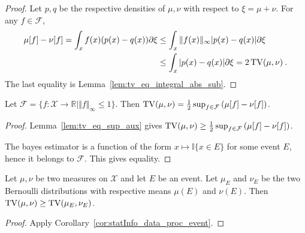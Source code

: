 \begin{proof}
Let $p,q$ be the respective densities of $\mu, \nu$ with respect to $\xi=\mu+\nu$.
For any $f \in \mathcal F$,
\begin{align*}
\mu[f] - \nu[f]
= \int_x f(x)(p(x) - q(x)) \partial\xi
&\le \int_x \Vert f(x) \Vert_\infty \vert p(x) - q(x) \vert \partial\xi
\\
&\le \int_x \vert p(x) - q(x) \vert \partial\xi
= 2 \operatorname{TV}(\mu, \nu)
\: .
\end{align*}
The last equality is Lemma~\ref{lem:tv_eq_integral_abs_sub}.
\end{proof}


\begin{theorem}
  \label{thm:tv_eq_sup_sub_integral}
  Let $\mathcal F = \{f : \mathcal X \to \mathbb{R} \mid \Vert f \Vert_\infty \le 1\}$.
  Then $\operatorname{TV}(\mu, \nu) = \frac{1}{2} \sup_{f \in \mathcal F} \left( \mu[f] - \nu[f] \right)$.
\end{theorem}

\begin{proof}
Lemma~\ref{lem:tv_eq_sup_aux} gives $\operatorname{TV}(\mu, \nu) \ge \frac{1}{2} \sup_{f \in \mathcal F} \left( \mu[f] - \nu[f] \right)$.

The bayes estimator is a function of the form $x \mapsto \mathbb{I}\{x \in E\}$ for some event $E$, hence it belongs to $\mathcal F$. This gives equality.
\end{proof}


\begin{lemma}
  \label{lem:tv_data_proc_event}
  Let $\mu, \nu$ be two measures on $\mathcal X$ and let $E$ be an event. Let $\mu_E$ and $\nu_E$ be the two Bernoulli distributions with respective means $\mu(E)$ and $\nu(E)$.
  Then $\operatorname{TV}(\mu, \nu) \ge \operatorname{TV}(\mu_E, \nu_E)$.
\end{lemma}

\begin{proof}
Apply Corollary~\ref{cor:statInfo_data_proc_event}.
\end{proof}
